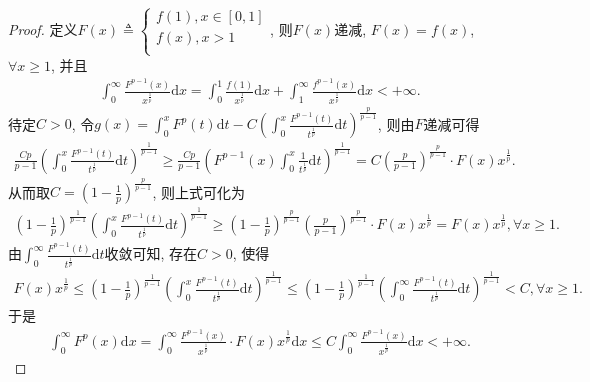 \documentclass[../../main.tex]{subfiles}%
\begin{document}
\begin{proof}
定义$F\left( x \right) \triangleq \begin{cases}
f\left( 1 \right) ,x\in \left[ 0,1 \right]\\
f\left( x \right) ,x>1\\
\end{cases}$, 则$F\left( x \right) $递减, $F\left( x \right) =f\left( x \right) $, $\forall x\geqslant 1$, 并且
\begin{align*}
\int_0^{\infty}{\frac{F^{p-1}\left( x \right)}{x^{\frac{1}{p}}}\mathrm{d}x}=\int_0^1{\frac{f\left( 1 \right)}{x^{\frac{1}{p}}}\mathrm{d}x}+\int_1^{\infty}{\frac{f^{p-1}\left( x \right)}{x^{\frac{1}{p}}}\mathrm{d}x}<+\infty .
\end{align*}
待定$C>0$, 令$g\left( x \right) =\int_0^x{F^p\left( t \right)}\mathrm{d}t-C\left( \int_0^x{\frac{F^{p-1}\left( t \right)}{t^{\frac{1}{p}}}\mathrm{d}t} \right) ^{\frac{p}{p-1}}$, 则由$F$递减可得
\begin{align*}
\frac{Cp}{p-1}\left( \int_0^x{\frac{F^{p-1}\left( t \right)}{t^{\frac{1}{p}}}\mathrm{d}t} \right) ^{\frac{1}{p-1}}\geqslant \frac{Cp}{p-1}\left( F^{p-1}\left( x \right) \int_0^x{\frac{1}{t^{\frac{1}{p}}}\mathrm{d}t} \right) ^{\frac{1}{p-1}}=C\left( \frac{p}{p-1} \right) ^{\frac{p}{p-1}}\cdot F\left( x \right) x^{\frac{1}{p}}.
\end{align*}
从而取$C=\left( 1-\frac{1}{p} \right) ^{\frac{p}{p-1}}$, 则上式可化为
\begin{align*}
\left( 1-\frac{1}{p} \right) ^{\frac{1}{p-1}}\left( \int_0^x{\frac{F^{p-1}\left( t \right)}{t^{\frac{1}{p}}}\mathrm{d}t} \right) ^{\frac{1}{p-1}}\geqslant \left( 1-\frac{1}{p} \right) ^{\frac{p}{p-1}}\left( \frac{p}{p-1} \right) ^{\frac{p}{p-1}}\cdot F\left( x \right) x^{\frac{1}{p}}=F\left( x \right) x^{\frac{1}{p}},\forall x\geqslant 1.
\end{align*}
由$\int_0^{\infty}{\frac{F^{p-1}\left( t \right)}{t^{\frac{1}{p}}}\mathrm{d}t}$收敛可知, 存在$C>0$, 使得
\begin{align*}
F\left( x \right) x^{\frac{1}{p}}\leqslant \left( 1-\frac{1}{p} \right) ^{\frac{1}{p-1}}\left( \int_0^x{\frac{F^{p-1}\left( t \right)}{t^{\frac{1}{p}}}\mathrm{d}t} \right) ^{\frac{1}{p-1}}\leqslant \left( 1-\frac{1}{p} \right) ^{\frac{1}{p-1}}\left( \int_0^{\infty}{\frac{F^{p-1}\left( t \right)}{t^{\frac{1}{p}}}\mathrm{d}t} \right) ^{\frac{1}{p-1}}<C,\forall x\geqslant 1.
\end{align*}
于是
\begin{align*}
\int_0^{\infty}{F^p\left( x \right)}\mathrm{d}x=\int_0^{\infty}{\frac{F^{p-1}\left( x \right)}{x^{\frac{1}{p}}}\cdot F\left( x \right) x^{\frac{1}{p}}\mathrm{d}x}\leqslant C\int_0^{\infty}{\frac{F^{p-1}\left( x \right)}{x^{\frac{1}{p}}}\mathrm{d}x}<+\infty .
\end{align*}
\end{proof}
\end{document}
